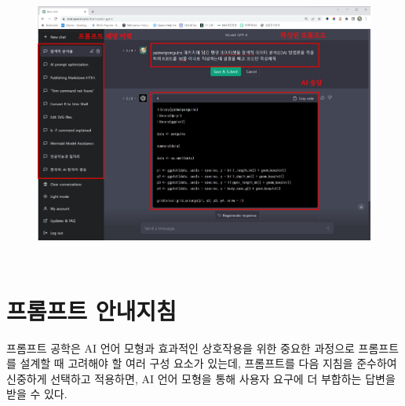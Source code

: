 \documentclass[
  letterpaper,
]{book}
\begin{document}
\begin{figure}
\begin{minipage}[t]{0.05\linewidth}
\end{minipage}%

\caption{\label{fig-prompt-start}\includegraphics[width=4.95833in,height=3.64583in]{images/chatGPT_result.jpg}}

\end{figure}

\hypertarget{uxd504uxb86cuxd504uxd2b8-uxc548uxb0b4uxc9c0uxce68}{%
\section{프롬프트
안내지침}\label{uxd504uxb86cuxd504uxd2b8-uxc548uxb0b4uxc9c0uxce68}}

프롬프트 공학은 AI 언어 모형과 효과적인 상호작용을 위한 중요한 과정으로
프롬프트를 설계할 때 고려해야 할 여러 구성 요소가 있는데, 프롬프트를
다음 지침을 준수하여 신중하게 선택하고 적용하면, AI 언어 모형을 통해
사용자 요구에 더 부합하는 답변을 받을 수 있다.
\end{document}
